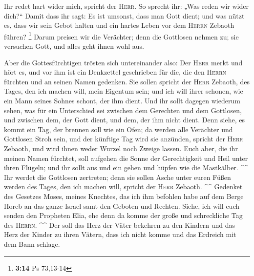  Ihr redet hart wider mich, spricht der \textsc{Herr}. So
sprecht ihr: „Was reden wir wider dich?{}``  Damit dass
ihr sagt: Es ist umsonst, dass man Gott dient; und was nützt es, dass
wir sein Gebot halten und ein hartes Leben vor dem \textsc{Herrn}
Zebaoth führen? \footnote{\textbf{3:14} Ps 73,13-14} 
Darum preisen wir die Verächter; denn die Gottlosen nehmen zu; sie
versuchen Gott, und alles geht ihnen wohl aus.

 Aber die Gottesfürchtigen trösten sich untereinander
also: Der \textsc{Herr} merkt und hört es, und vor ihm ist ein
Denkzettel geschrieben für die, die den \textsc{Herrn} fürchten und an
seinen Namen gedenken.  Sie sollen spricht der
\textsc{Herr} Zebaoth, des Tages, den ich machen will, mein Eigentum
sein; und ich will ihrer schonen, wie ein Mann seines Sohnes schont, der
ihm dient.  Und ihr sollt dagegen wiederum sehen, was für
ein Unterschied sei zwischen dem Gerechten und dem Gottlosen, und
zwischen dem, der Gott dient, und dem, der ihm nicht dient.
 Denn siehe, es kommt ein Tag, der brennen soll wie ein
Ofen; da werden alle Verächter und Gottlosen Stroh sein, und der
künftige Tag wird sie anzünden, spricht der \textsc{Herr} Zebaoth, und
wird ihnen weder Wurzel noch Zweige lassen.  Euch aber,
die ihr meinen Namen fürchtet, soll aufgehen die Sonne der Gerechtigkeit
und Heil unter ihren Flügeln; und ihr sollt aus und ein gehen und hüpfen
wie die Mastkälber. \^{}\^{}  Ihr werdet die Gottlosen
zertreten; denn sie sollen Asche unter euren Füßen werden des Tages, den
ich machen will, spricht der \textsc{Herr} Zebaoth. \^{}\^{}
 Gedenket des Gesetzes Moses, meines Knechtes, das ich
ihm befohlen habe auf dem Berge Horeb an das ganze Israel samt den
Geboten und Rechten.  Siehe, ich will euch senden den
Propheten Elia, ehe denn da komme der große und schreckliche Tag des
\textsc{Herrn}. \^{}\^{}  Der soll das Herz der Väter
bekehren zu den Kindern und das Herz der Kinder zu ihren Vätern, dass
ich nicht komme und das Erdreich mit dem Bann schlage.

